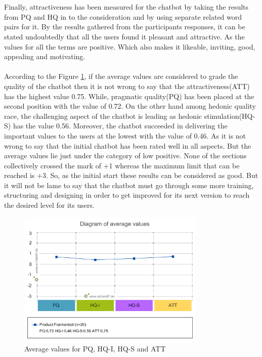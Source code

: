 \\~\\
Finally, attractiveness has been measured for the chatbot by taking the results from PQ and HQ in to the consideration and by using separate related word pairs for it. By the results gathered from the participants responses, it can be stated undoubtedly that all the users found it pleasant and attractive. As the values for all the terms are positive. Which also makes it likeable, inviting, good, appealing and motivating.
\\~\\
According to the Figure \ref{fig:avgValAttrak}, if the average values are considered to grade the quality of the chatbot then it is not wrong to say that the attractiveness(ATT) has the highest value 0.75. While, pragmatic quality(PQ) has been placed at the second position with the value of 0.72. On the other hand among hedonic quality race, the challenging aspect of the chatbot is leading as hedonic stimulation(HQ-S) has the value 0.56. Moreover, the chatbot succeeded in delivering the important values to the users at the lowest with the value of 0.46. As it is not wrong to say that the initial chatbot has been rated well in all aspects. But the average values lie just under the category of low positive. None of the sections collectively crossed the mark of +1 whereas the maximum limit that can be reached is +3. So, as the initial start these results can be considered as good. But it will not be lame to say that the chatbot must go through some more training, structuring and designing in order to get improved for its next version to reach the desired level for its users.

\begin{figure}[!h]
    \centering
    \includegraphics[width=0.8\textwidth]{img/Diagram_of_average_values.png}
    \caption{Average values for PQ, HQ-I, HQ-S and ATT}
    \label{fig:avgValAttrak}
\end{figure}
\\~\\

